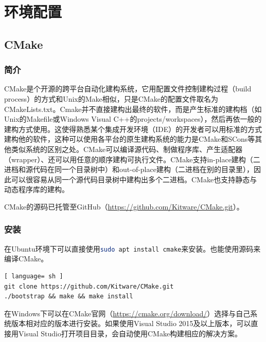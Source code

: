 \chapter{环境配置}
	\section{CMake}
		\subsection{简介}
			\par CMake是个开源的跨平台自动化建构系统，它用配置文件控制建构过程（build process）的方式和Unix的Make相似，只是CMake的配置文件取名为CMakeLists.txt。Cmake并不直接建构出最终的软件，而是产生标准的建构档（如Unix的Makefile或Windows Visual C++的projects/workspaces），然后再依一般的建构方式使用。这使得熟悉某个集成开发环境（IDE）的开发者可以用标准的方式建构他的软件，这种可以使用各平台的原生建构系统的能力是CMake和SCons等其他类似系统的区别之处。CMake可以编译源代码、制做程序库、产生适配器（wrapper）、还可以用任意的顺序建构可执行文件。CMake支持in-place建构（二进档和源代码在同一个目录树中）和out-of-place建构（二进档在别的目录里），因此可以很容易从同一个源代码目录树中建构出多个二进档。CMake也支持静态与动态程序库的建构。\cite{ wiki:CMake}
			\par CMake的源码已托管至GitHub（\href{https://github.com/Kitware/CMake.git}{https://github.com/Kitware/CMake.git}）。
		\subsection{安装}
			\par 在Ubuntu环境下可以直接使用\lstinline[language=sh]{sudo apt install cmake}来安装。也能使用源码来编译CMake。
			\begin{lstlisting}[ language= sh ]
git clone https://github.com/Kitware/CMake.git
./bootstrap && make && make install
			\end{lstlisting}
			\par 在Windows下可以在CMake官网（\href{https://cmake.org/download/}{https://cmake.org/download/}）选择与自己系统版本相对应的版本进行安装。如果使用Visual Studio 2015及以上版本，可以直接用Visual Studio打开项目目录，会自动使用CMake构建相应的解决方案。
